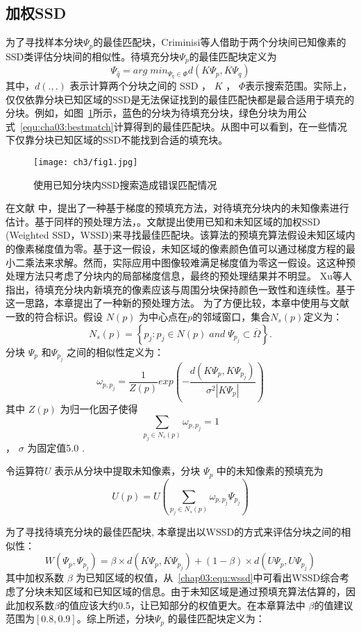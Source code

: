  \subsection{加权SSD}
 \label{sec:sub:WSSD}
 为了寻找样本分块\(\Psi_p\)的最佳匹配块，Criminisi等人\cite{Criminisi04regionfilling}借助于两个分块间已知像素的SSD类评估分块间的相似性。待填充分块\(\Psi_p\)的最佳匹配块定义为
 \begin{equation}
 \label{equ:cha03:bestmatch}
 \Psi_{\hat{q}}=arg\;min_{\Psi_q\in\Phi}d(K\Psi_p,K\Psi_q)
 \end{equation}
 其中，\(d(.,.)\) 表示计算两个分块之间的 SSD ， \(K\) ， \(\Phi\)表示搜索范围。实际上，仅仅依靠分块已知区域的SSD是无法保证找到的最佳匹配快都是最合适用于填充的分块。例如，如图~\ref{cha03:fig:1}所示，蓝色的分块为待填充分块，绿色分块为用公式~\ref{equ:cha03:bestmatch}计算得到的最佳匹配块。从图中可以看到，在一些情况下仅靠分块已知区域的SSD不能找到合适的填充块。
 \begin{figure}[!htbp]
 	\begin{center}
 			\texttt{[image: ch3/fig1.jpg]}
 	\end{center}
     \caption{使用已知分块内SSD搜索造成错误匹配情况}
 	\label{cha03:fig:1}
 \end{figure}
 在文献 中，提出了一种基于梯度的预填充方法，对待填充分块内的未知像素进行估计。基于同样的预处理方法，。文献提出使用已知和未知区域的加权SSD (Weighted SSD，WSSD)来寻找最佳匹配块。该算法的预填充算法假设未知区域内的像素梯度值为零。基于这一假设，未知区域的像素颜色值可以通过梯度方程的最小二乘法来求解。然而，实际应用中图像较难满足梯度值为零这一假设。这这种预处理方法只考虑了分块内的局部梯度信息，最终的预处理结果并不明显。 Xu等人\cite{Xu:2010}指出，待填充分块内新填充的像素应该与周围分块保持颜色一致性和连续性。基于这一思路，本章提出了一种新的预处理方法。
 为了方便比较，本章中使用与文献一致的符合标识。假设 \(N(p)\) 为中心点在\(p\)的邻域窗口，集合\(N_s(p)\)定义为：
 $$N_s(p)= \left\{ p_j:p_j \in N(p)\;and\;\Psi_{p_j} \subset \overline{\Omega} \right\}.$$
 分块 \(\Psi_p\) 和\(\Psi_{p_j}\)  之间的相似性定义为：
 $$\omega_{p,p_{j}}=\frac{1}{Z(p)}exp\left(-\frac{d(K\Psi_p,K\Psi_{p_j})}{\sigma^2\left|K\Psi_p\right|}\right)$$
 其中 \(Z(p)\) 为归一化因子使得 $$\sum_{p_j\in N_s(p)}\omega_{p,p_j} = 1$$ ， \(\sigma\) 为固定值5.0 \cite{Xu:2010}.\par
 令运算符\(U\) 表示从分块中提取未知像素，分块 \(\Psi_p\) 中的未知像素的预填充为
 $$U(p)=U\left(\sum_{p_j \in N_s(p)}{\omega_{p,p_j}\Psi_{p_j}}\right)$$\par
 为了寻找待填充分块的最佳匹配块, 本章提出以WSSD的方式来评估分块之间的相似性：
 \begin{equation}
 W(\Psi_p,\Psi_{p_j})=\beta\times d(K\Psi_p,K\Psi_{p_j})+(1-\beta)\times d(U\Psi_p,U\Psi_{p_j})
 \label{chap03:equ:wssd}
 \end{equation}
 其中加权系数 \(\beta\) 为已知区域的权值，从~\ref{chap03:equ:wssd}中可看出WSSD综合考虑了分块未知区域和已知区域的信息。由于未知区域是通过预填充算法估算的，因此加权系数\(\beta\)的值应该大约0.5，让已知部分的权值更大。在本章算法中 \(\beta\)的值建议范围为$[0.8, 0.9]$。综上所述，分块\(\Psi_p\) 的最佳匹配块定义为：


